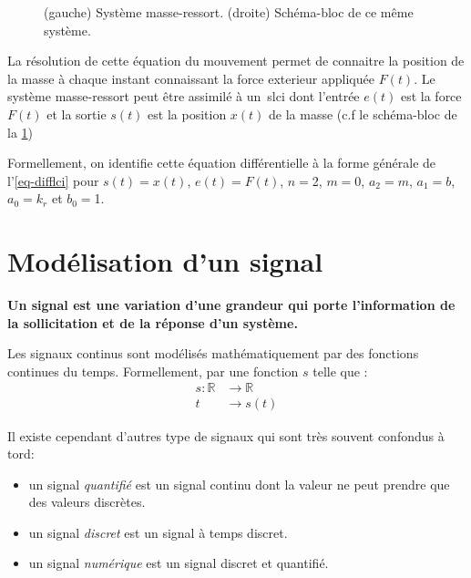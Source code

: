 \begin{figure}[!h]
    \centering
    
    \caption{(gauche) Système masse-ressort. (droite) Schéma-bloc de ce même système.\label{fig-masse-ressort}}
\end{figure}

La résolution de cette équation du mouvement permet de connaitre la position de la masse
à chaque instant connaissant la force exterieur appliquée $F(t)$. Le système masse-ressort
peut être assimilé à un~\gls{slci} dont l'entrée $e(t)$ est la force $F(t)$ et 
la sortie $s(t)$ est la position $x(t)$ de la masse (c.f le schéma-bloc de la \cref{fig-masse-ressort})

Formellement, on identifie cette équation différentielle à la forme générale 
de l'\cref{eq-difflci} pour $s(t)=x(t)$, $e(t)=F(t)$, 
$n=$2, $m=0$, $a_2=m$, $a_1=b$, $a_0=k_r$ et $b_0=$1.




\section{Modélisation d'un signal}
\textbf{Un signal est une variation d'une grandeur qui porte l'information de la 
sollicitation et de la réponse d'un système.}

Les signaux continus sont modélisés mathématiquement par des fonctions continues 
du temps. Formellement, par une fonction $s$ telle que :
\begin{align*}
s : \mathbb{R}&\rightarrow\mathbb{R} \\  
t&\rightarrow s(t) 
\end{align*}    

Il existe cependant d'autres type de signaux qui sont très souvent confondus à tord:
\begin{itemize}
    \item un signal \emph{quantifié} est un signal continu 
          dont la valeur ne peut prendre que des valeurs discrètes. 
    \item un signal \emph{discret} est un signal à temps discret.
    \item un signal \emph{numérique} est un signal discret et quantifié.   
\end{itemize}

